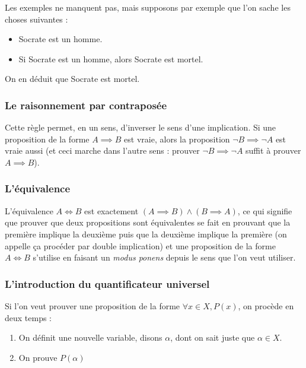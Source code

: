 \begin{expl}
    Les exemples ne manquent pas, mais supposons par exemple que l'on sache les choses suivantes :
    \begin{itemize}[label=$\bullet$]
        \item Socrate est un homme.
        \item Si Socrate est un homme, alors Socrate est mortel.
    \end{itemize}
    
    On en déduit que Socrate est mortel.
\end{expl}

\subsubsection{Le raisonnement par contraposée}

Cette règle permet, en un sens, d'inverser le sens d'une implication. Si une proposition de la forme $A\implies B$ est vraie, alors la proposition $\lnot B \implies \lnot A$ est vraie aussi (et ceci marche dans l'autre sens : prouver $\lnot B \implies \lnot A$ suffit à prouver $A\implies B$).

\subsubsection{L'équivalence}

L'équivalence $A\iff B$ est exactement $(A\implies B)\land (B\implies A)$, ce qui signifie que prouver que deux propositions sont équivalentes se fait en prouvant que la première implique la deuxième puis que la deuxième implique la première (on appelle ça procéder par double implication) et une proposition de la forme $A\iff B$ s'utilise en faisant un \textit{modus ponens} depuis le sens que l'on veut utiliser.

\subsubsection{L'introduction du quantificateur universel}

Si l'on veut prouver une proposition de la forme $\forall x\in X, P(x)$, on procède en deux temps :

\begin{enumerate}
    \item On définit une nouvelle variable, disons $\alpha$, dont on sait juste que $\alpha \in X$.
    \item On prouve $P(\alpha)$
\end{enumerate}

